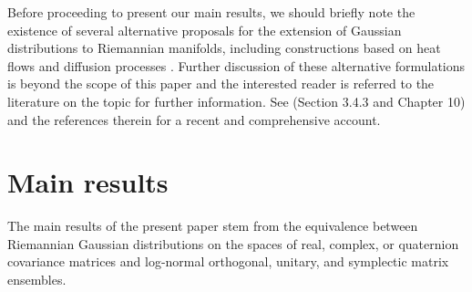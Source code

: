 \documentclass[draftclsnofoot]{IEEEtran}
\begin{document}


Before proceeding to present our main results, we should briefly note the existence of several alternative proposals for the extension of Gaussian distributions to Riemannian manifolds, including constructions based on heat flows and diffusion processes \cite{Sommer2015}. Further discussion of these alternative formulations is beyond the scope of this paper and the interested reader is referred to the literature on the topic for further information. See \cite{Pennec2019} (Section 3.4.3 and Chapter 10) and the references therein for a recent and comprehensive account.

\section{Main results} \label{sec:contribution}
The main results of the present paper stem from the equivalence between Riemannian Gaussian distributions on the spaces of real, complex, or quaternion covariance matrices and log-normal orthogonal, unitary, and symplectic matrix ensembles.
\end{document}
